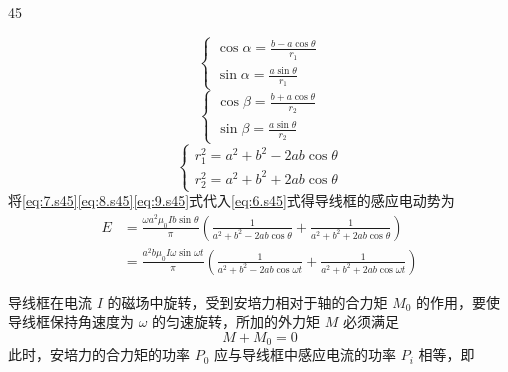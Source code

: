 \begin{solution}{45}
\begin{subsolution}
\begin{equation}
            \begin{cases}
                \cos\alpha = \frac{b - a\cos\theta}{r_{1}} \\
                \sin\alpha = \frac{a\sin\theta}{r_{1}}
            \end{cases}
            \label{eq:7.s45}
        \end{equation}
        \begin{equation}
            \begin{cases}
                \cos\beta = \frac{b + a\cos\theta}{r_{2}} \\
                \sin\beta = \frac{a\sin\theta}{r_{2}}
            \end{cases}
            \label{eq:8.s45}
        \end{equation}
        \begin{equation}
            \begin{cases}
                r_{1}^{2} = a^{2} + b^{2} - 2ab\cos\theta \\
                r_{2}^{2} = a^{2} + b^{2} + 2ab\cos\theta
            \end{cases}
            \label{eq:9.s45}
        \end{equation}
        将\eqref{eq:7.s45}\eqref{eq:8.s45}\eqref{eq:9.s45}式代入\eqref{eq:6.s45}式得导线框的感应电动势为
        \begin{equation}
            \begin{aligned}
                E &= \frac{\omega a^{2} \mu_{0} I b \sin\theta}{\pi} \left(\frac{1}{a^{2} + b^{2} - 2ab\cos\theta} + \frac{1}{a^{2} + b^{2} + 2ab\cos\theta}\right) \\
                &= \frac{a^{2} b \mu_{0} I \omega \sin\omega t}{\pi} \left(\frac{1}{a^{2} + b^{2} - 2ab\cos\omega t} + \frac{1}{a^{2} + b^{2} + 2ab\cos\omega t}\right)
            \end{aligned}
            \label{eq:10.s45}
        \end{equation}
    \end{subsolution}
    \begin{subsolution}
        导线框在电流 $I$ 的磁场中旋转，受到安培力相对于轴的合力矩 $M_{0}$ 的作用，要使导线框保持角速度为 $\omega$ 的匀速旋转，所加的外力矩 $M$ 必须满足
        \begin{equation}
            M + M_{0} = 0
            \label{eq:11.s45}
        \end{equation}
        此时，安培力的合力矩的功率 $P_{0}$ 应与导线框中感应电流的功率 $P_{i}$ 相等，即
        \begin{equation}

\end{equation}
\end{subsolution}
\end{solution}
